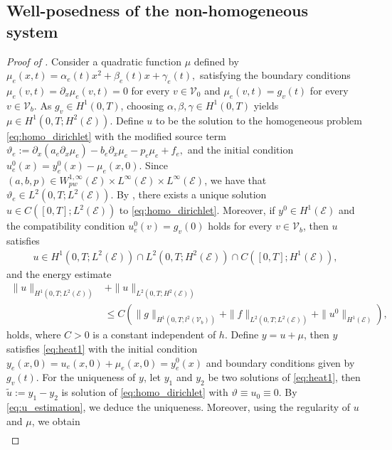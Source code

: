 \documentclass[10pt,a4paper]{amsart}
\begin{document}
\subsection{Well-posedness of the non-homogeneous system}
\begin{proof}[Proof of ]
    Consider a quadratic function $\mu$ defined by $\mu_e(x,t) = \alpha_e(t) x^2 + \beta_e(t) x + \gamma_e(t),$ satisfying the boundary conditions $\mu_e(v,t) = \partial_x \mu_e(v,t) = 0$ for every $v \in \mathcal{V}_0$ and $ \mu_e(v,t) = g_v(t)$ for every $v \in \mathcal{V}_b$. As $g_v \in H^1(0,T)$, choosing $\alpha,\beta,\gamma \in H^1(0,T)$ yields $\mu \in H^1(0,T; H^2(\mathcal{E}))$. Define $u$ to be the solution to the homogeneous problem \eqref{eq:homo_dirichlet} with the modified source term $\vartheta_e := \partial_x(a_e \partial_x \mu_e) - b_e \partial_x \mu_e - p_e \mu_e + f_e,$ and the initial condition $ u^0_e(x) = y^0_e(x) - \mu_e(x,0)$. Since $(a, b, p) \in W^{1,\infty}_{pw}(\mathcal{E}) \times L^{\infty}(\mathcal{E}) \times L^{\infty}(\mathcal{E})$, we have that $\vartheta_e\in L^2(0,T; L^2(\mathcal{E}))$.
    By , there exists a unique solution $u \in C([0,T]; L^2(\mathcal{E}))$ to \eqref{eq:homo_dirichlet}. Moreover, if $y^0 \in H^1(\mathcal{E})$ and the compatibility condition $u^0_e(v) = g_v(0)$ holds for every $v \in \mathcal{V}_b$, then $u$ satisfies
    \begin{align*}
        u \in H^1(0,T; L^2(\mathcal{E})) \cap L^2(0,T; H^2(\mathcal{E})) \cap C([0,T]; H^1(\mathcal{E})),
    \end{align*}
    and the energy estimate
    \begin{align*}
        \|u\|_{H^1(0,T; L^2(\mathcal{E}))} &+ \|u\|_{L^2(0,T; H^2(\mathcal{E}))} \\
        &\leq C \left( \|g\|_{H^1(0,T; l^2(\mathcal{V}_b))} + \|f\|_{L^2(0,T; L^2(\mathcal{E}))} + \|u^0\|_{H^1(\mathcal{E})} \right),
    \end{align*}
    holds, where $C > 0$ is a constant independent of $h$. Define $y = u + \mu$, then $y$ satisfies \eqref{eq:heat1} with the initial condition $y_e(x,0) = u_e(x,0) + \mu_e(x,0) = y^0_e(x)$ and boundary conditions given by $g_v(t)$. For the uniqueness of $y$, let $y_1$ and $y_2$ be two solutions of \eqref{eq:heat1}, then $\tilde u:= y_1-y_2$ is solution of \eqref{eq:homo_dirichlet} with $\vartheta\equiv u_0\equiv 0$. By \eqref{eq:u_estimation}, we deduce the uniqueness. Moreover, using the regularity of $u$ and $\mu$, we obtain
    \begin{align*}

\end{align*}
\end{proof}
\end{document}
